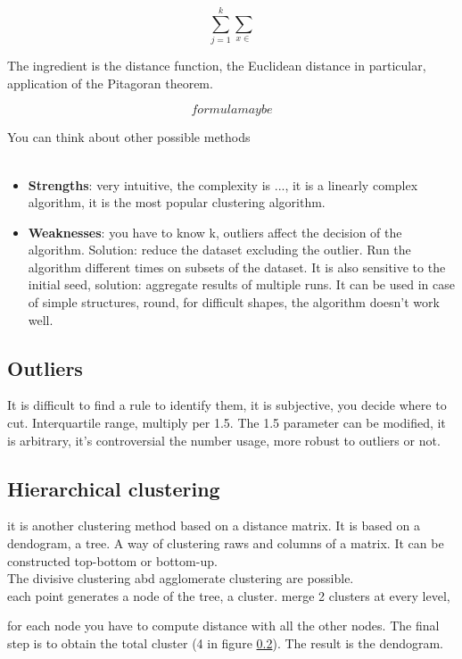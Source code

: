 $$\sum_{j=1}^k\sum_{x\in}$$

The ingredient is the distance function, the Euclidean distance in particular, application of the Pitagoran theorem.

$$formula maybe$$

You can think about other possible methods\\\\

\begin{itemize}
\item \textbf{Strengths}: very intuitive, the complexity is ..., it is a linearly complex algorithm, it is the most popular clustering algorithm.\\
	\item \textbf{Weaknesses}: you have to know k, outliers affect the decision of the algorithm. Solution: reduce the dataset excluding the outlier. Run the algorithm different times on subsets of the dataset. It is also sensitive to the initial seed, solution: aggregate results of multiple runs. It can be used in case of simple structures, round, for difficult shapes, the algorithm doesn't work well.
\end{itemize}
	
\subsection{Outliers}
It is difficult to find a rule to identify them, it is subjective, you decide where to cut.  Interquartile range, multiply per 1.5. The 1.5 parameter can be modified, it is arbitrary, it's controversial the number usage, more robust to outliers or not. 

\subsection{Hierarchical clustering} 
it is another clustering method based on a distance matrix. It is based on a dendogram, a tree. A way of clustering raws and columns of a matrix. It can be constructed top-bottom or bottom-up. \\

The divisive clustering abd agglomerate clustering are possible.\\

each point generates a node of the tree, a cluster. merge 2 clusters at every level, 

for each node you have to compute distance with all the other nodes. The final step is to obtain the total cluster (4 in figure \ref{}). The result is the dendogram.\\


